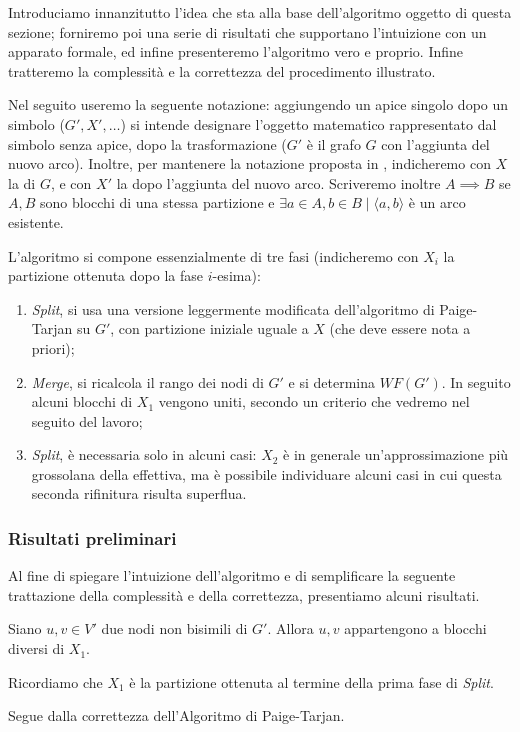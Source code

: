 Introduciamo innanzitutto l'idea che sta alla base dell'algoritmo oggetto di questa sezione; forniremo poi una serie di risultati che supportano l'intuizione con un apparato formale, ed infine presenteremo l'algoritmo vero e proprio. Infine tratteremo la complessità e la correttezza del procedimento illustrato.

Nel seguito useremo la seguente notazione: aggiungendo un apice singolo dopo un simbolo ($G', X', \dots$) si intende designare l'oggetto matematico rappresentato dal simbolo senza apice, dopo la trasformazione ($G'$ è il grafo $G$ con l'aggiunta del nuovo arco). Inoltre, per mantenere la notazione proposta in \cite{saha}, indicheremo con $X$ la \rscpnomath di $G$, e con $X'$ la \rscpnomath dopo l'aggiunta del nuovo arco. Scriveremo inoltre $A \implies B$ se $A,B$ sono blocchi di una stessa partizione e $\exists a \in A, b \in B \mid \langle a, b\rangle$ è un arco esistente.

L'algoritmo si compone essenzialmente di tre fasi (indicheremo con $X_i$ la partizione ottenuta dopo la fase $i$-esima):
\begin{enumerate}
    \item \emph{Split}, si usa una versione leggermente modificata dell'algoritmo di Paige-Tarjan su $G'$, con partizione iniziale uguale a $X$ (che deve essere nota a priori);
    \item \emph{Merge}, si ricalcola il rango dei nodi di $G'$ e si determina $WF(G')$. In seguito alcuni blocchi di $X_1$ vengono uniti, secondo un criterio che vedremo nel seguito del lavoro;
    \item \emph{Split}, è necessaria solo in alcuni casi: $X_2$ è in generale un'approssimazione più grossolana della \rscpnomath effettiva, ma è possibile individuare alcuni casi in cui questa seconda rifinitura risulta superflua.
\end{enumerate}

\subsubsection{Risultati preliminari}
Al fine di spiegare l'intuizione dell'algoritmo e di semplificare la seguente trattazione della complessità e della correttezza, presentiamo alcuni risultati.

\begin{proposition}
    Siano $u,v \in V'$ due nodi non bisimili di $G'$. Allora $u,v$ appartengono a blocchi diversi di $X_1$.
\end{proposition}
Ricordiamo che $X_1$ è la partizione ottenuta al termine della prima fase di \emph{Split}.
\begin{proof2}
    Segue dalla correttezza dell'Algoritmo di Paige-Tarjan.
\end{proof2}

